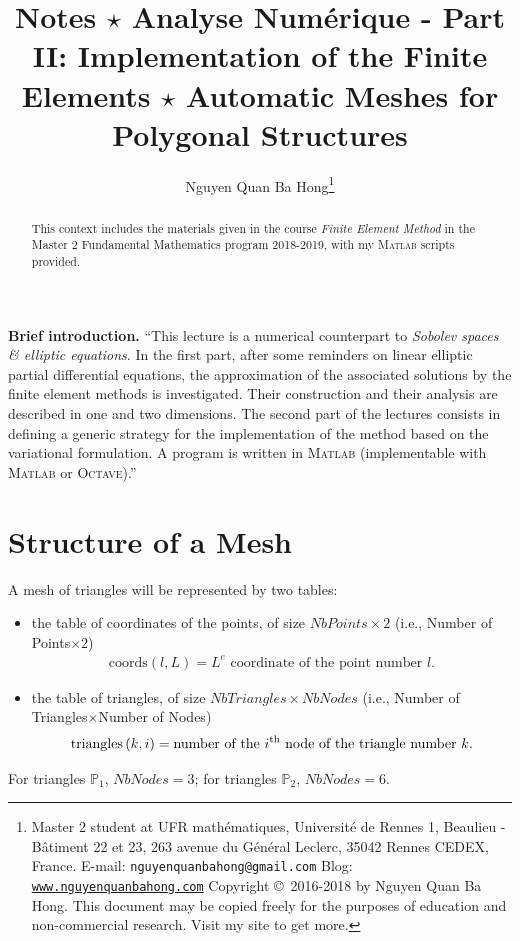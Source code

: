 \documentclass[11pt,a4paper,center,notitlepage]{article}
\title{Notes $\star$ Analyse Num\'erique - Part II: Implementation of the Finite Elements $\star$ Automatic Meshes for Polygonal Structures}
\author{Nguyen Quan Ba Hong\footnote{Master 2 student at UFR math\'ematiques, Universit\'e de Rennes 1, Beaulieu - B\^atiment 22 et 23, 263 avenue du G\'en\'eral Leclerc, 35042 Rennes CEDEX, France.\newline
E-mail: \texttt{nguyenquanbahong@gmail.com} \newline
Blog: \texttt{\url{www.nguyenquanbahong.com}} \newline 
Copyright \copyright\ 2016-2018 by Nguyen Quan Ba Hong. This document may be copied freely for the purposes of education and non-commercial research. Visit my site to get more.}}
\numberwithin{equation}{section}
\begin{document}
\maketitle
\begin{abstract}
This context includes the materials given in the course \textit{Finite Element Method} in the Master 2 Fundamental Mathematics program 2018-2019, with my \textsc{Matlab} scripts provided.
\end{abstract}
%
\maketitle
\textbf{Brief introduction.} ``This lecture is a numerical counterpart to \textit{Sobolev spaces \& elliptic equations}. In the first part, after some reminders on linear elliptic partial differential equations, the approximation of the associated solutions by the finite element methods is investigated. Their construction and their analysis are described in one and two dimensions. The second part of the lectures consists in defining a generic strategy for the implementation of the method based on the variational formulation. A program is written in \textsc{Matlab} (implementable with \textsc{Matlab} or \textsc{Octave}).''
\newpage
\tableofcontents
\newpage

\section{Structure of a Mesh}\label{sec1}
A mesh of triangles will be represented by two tables: 
\begin{itemize}
\item the table of coordinates of the points, of size $NbPoints \times 2$ (i.e., Number of Points$\times 2$)
\begin{align}
\mbox{coords}\left(l,L\right) = L^e \mbox{ coordinate of the point number }l.
\end{align}
\item the table of triangles, of size $NbTriangles \times NbNodes$ (i.e., Number of Triangles$\times$Number of Nodes)
\begin{align}
\mbox{triangles}\left(k,i\right) = \mbox{number of the }i^{\rm th} \mbox{ node of the triangle number } k.
\end{align}
\end{itemize}
For triangles $\mathbb{P}_1$, $NbNodes =3$; for triangles $\mathbb{P}_2$, $NbNodes =6$.
\end{document}
